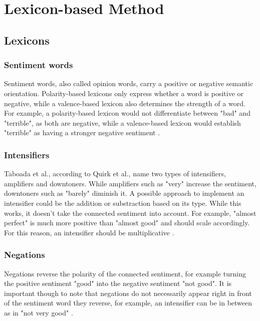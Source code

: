 \section{Lexicon-based Method}

\subsection{Lexicons}

\subsubsection{Sentiment words}
Sentiment words, also called opinion words, carry a positive or negative semantic orientation. Polarity-based lexicons only express whether a word is positive or negative, while a valence-based lexicon also determines the strength of a word. For example, a polarity-based lexicon would not differentiate between "bad" and "terrible", as both are negative, while a valence-based lexicon would establish "terrible" as having a stronger negative sentiment \cite{DBLP:conf/icwsm/HuttoG14}.

\subsubsection{Intensifiers}

Taboada et al., according to Quirk et al., name two types of intensifiers, amplifiers and downtoners. While amplifiers such as "very" increase the  sentiment, downtoners such as "barely" diminish it. A possible approach to implement an intensifier could be the addition or substraction based on its type. While this works, it doesn't take the connected sentiment into account. For example, "almost perfect" is much more positive than "almost good" and should scale accordingly. For this reason, an intensifier should be multiplicative \cite{10.1162/COLI_a_00049}.

\subsubsection{Negations}
Negations reverse the polarity of the connected sentiment, for example turning the positive sentiment "good" into the negative sentiment "not good". It is important though to note that negations do not necessarily appear right in front of the sentiment word they reverse, for example, an intensifier can be in between as in "not very good" \cite{10.1162/COLI_a_00049}.


